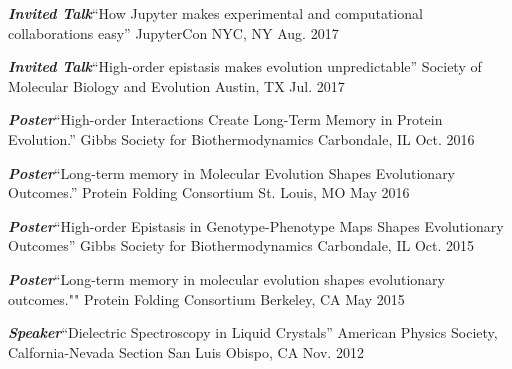 
\begin{cvpresentations}

  \cvpresentation
    {\textbf{\textit{Invited Talk}}{\enskip\cdotp\enskip}``How Jupyter makes experimental and computational collaborations easy''} %
    {JupyterCon} %
    {NYC, NY} %
    {Aug. 2017} %

  \cvpresentation
    {\textbf{\textit{Invited Talk}}{\enskip\cdotp\enskip}``High-order epistasis makes evolution unpredictable''} %
    {Society of Molecular Biology and Evolution} %
    {Austin, TX} %
    {Jul. 2017} %

  \cvpresentation
    {\textbf{\textit{Poster}}{\enskip\cdotp\enskip}``High-order Interactions Create Long-Term Memory in Protein Evolution.''} %
    {Gibbs Society for Biothermodynamics} %
    {Carbondale, IL} %
    {Oct. 2016} %

  \cvpresentation
    {\textbf{\textit{Poster}}{\enskip\cdotp\enskip}``Long-term memory in Molecular Evolution Shapes Evolutionary Outcomes.''} %
    {Protein Folding Consortium} %
    {St. Louis, MO} %
    {May 2016} %

  \cvpresentation
    {\textbf{\textit{Poster}}{\enskip\cdotp\enskip}``High-order Epistasis in Genotype-Phenotype Maps Shapes Evolutionary Outcomes''} %
    {Gibbs Society for Biothermodynamics} %
    {Carbondale, IL} %
    {Oct. 2015} %

  \cvpresentation
    {\textbf{\textit{Poster}}{\enskip\cdotp\enskip}``Long-term memory in molecular evolution shapes evolutionary outcomes.""} %
    {Protein Folding Consortium} %
    {Berkeley, CA} %
    {May 2015} %

  \cvpresentation
    {\textbf{\textit{Speaker}}{\enskip\cdotp\enskip}``Dielectric Spectroscopy in Liquid Crystals''} %
    {American Physics Society, Calfornia-Nevada Section} %
    {San Luis Obispo, CA} %
    {Nov. 2012} %

\end{cvpresentations}
